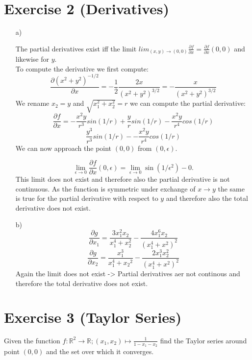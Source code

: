\documentclass[10pt]{article}
\numberwithin{equation}{section}
\begin{document}
\section*{Exercise 2 (Derivatives)}

\begin{enumerate}
\item[a)]{
The partial derivatives exist iff the limit $lim_{(x, y) \to (0, 0)} \frac{\partial f}{\partial x} = \frac{\partial f}{\partial x} (0, 0)$ and likewise for $y$. \\
To compute the derivative we first compute:
$$
\frac{\partial \left(x^2 + y^2\right)^{-1/2}}{\partial x}  = -\frac{1}{2} \frac{2x}{\left(x^2 + y^2\right)^{3/2}} = -\frac{x}{\left(x^2 + y^2\right)^{3/2}}
$$
We rename $x_2 = y$ and $\sqrt{x_1^2 + x_2^2} = r$ we can compute the partial derivative: 
$$
\frac{\partial f}{\partial x} = -\frac{x^2y}{r^3}sin(1/r) + \frac{y}{r}sin(1/r) -\frac{x^2y}{r^4} cos(1/r)
$$
$$
\frac{y^3}{r^3} sin(1/r) - -\frac{x^2y}{r^4} cos(1/r)
$$
We can now approach the point $(0, 0)$ from $(0, \epsilon)$. 

$$
\lim_{\epsilon \to 0} \frac{\partial f}{\partial x}( 0, \epsilon) = \lim_{\epsilon \to 0} \sin(1/\epsilon^2) - 0.
$$
This limit does not exist and therefore also the partial derivative is not continuous.
As the function is symmetric under exchange of $x \to y$ the same is true for the partial derivative with respect to $y$ and therefore also the total derivative does not exist.}
\item[b)]{
$$
\frac{\partial g}{ \partial x_1} = \frac{3x_1^2x_2}{x_1^4+x_2^2} - \frac{4x_1^6x_2}{(x_1^4 + x^2)^2}
$$
$$
\frac{\partial g}{ \partial x_2} = \frac{x_1^3}{x_1^4+{x_2}^2} - \frac{2x_1^3x_2^2}{(x_1^4 + x^2)^2} 
$$
Again the limit does not exist -> Partial derivatives aer not continous and therefore the total derivative does not exist.
}

\end{enumerate}

\section*{Exercise 3 (Taylor Series)}
Given the function $f: \mathbb{R}^2 \to \mathbb{R}; (x_1, x_2) \mapsto \frac{1}{1-x_1-x_2}$ find the Taylor series around point $(0, 0)$ and the set over which it converges. 
\end{document}
